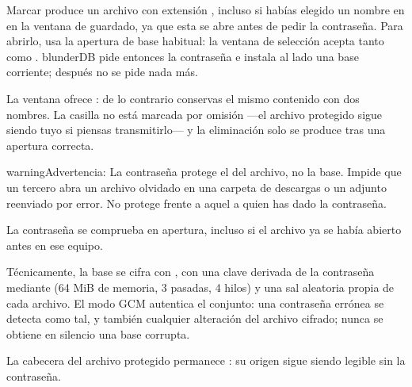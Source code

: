 \documentclass[letterpaper,10pt,spanish]{sphinxmanual}
\begin{document}
\sphinxAtStartPar
Marcar  produce un archivo con extensión , incluso si habías elegido un nombre en  en la ventana de guardado, ya que esta se abre antes de pedir la contraseña. Para abrirlo, usa la apertura de base habitual: la ventana de selección acepta tanto  como . blunderDB pide entonces la contraseña e instala al lado una base corriente; después no se pide nada más.

\sphinxAtStartPar
La ventana ofrece : de lo contrario conservas el mismo contenido con dos nombres. La casilla no está marcada por omisión —el archivo protegido sigue siendo tuyo si piensas transmitirlo— y la eliminación solo se produce tras una apertura correcta.

\begin{sphinxadmonition}{warning}{Advertencia:}
\sphinxAtStartPar
La contraseña protege el  del archivo, no la base. Impide que un tercero abra un archivo olvidado en una carpeta de descargas o un adjunto reenviado por error. No protege frente a aquel a quien has dado la contraseña.
\end{sphinxadmonition}

\sphinxAtStartPar
La contraseña se comprueba en  apertura, incluso si el archivo ya se había abierto antes en ese equipo.

\sphinxAtStartPar
Técnicamente, la base se cifra con , con una clave derivada de la contraseña mediante  (64 MiB de memoria, 3 pasadas, 4 hilos) y una sal aleatoria propia de cada archivo. El modo GCM autentica el conjunto: una contraseña errónea se detecta como tal, y también cualquier alteración del archivo cifrado; nunca se obtiene en silencio una base corrupta.

\sphinxAtStartPar
La cabecera del archivo protegido permanece : su origen sigue siendo legible sin la contraseña.
\end{document}
